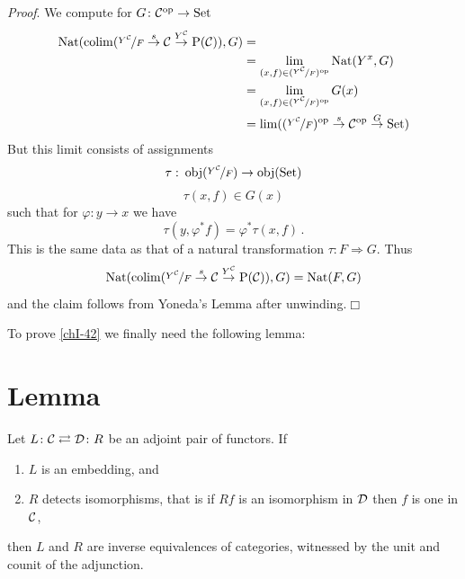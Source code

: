         \emph{Proof}. We compute for $G \colon \mathcal{C}^{\operatorname{op}} \to \operatorname{Set}$
        \begin{align*}
            \operatorname{Nat}(\operatorname*{colim}(\nicefrac{Y^{\mathcal{C}}}{F} \overset{s}{\rightarrow} \mathcal{C} \overset{Y^{\mathcal{C}}}{\rightarrow} \mathrm{P}(\mathcal{C})), G) &= \\
                    &= \lim\limits_{(x,f) \in (\nicefrac{Y^{\mathcal{C}}}{F})^{\operatorname{op}}}\operatorname{Nat}(Y^x, G) \\
                    &= \lim\limits_{(x,f) \in (\nicefrac{Y^{\mathcal{C}}}{F})^{\operatorname{op}}} G(x) \\
                    &= \lim((\nicefrac{Y^{\mathcal{C}}}{F})^{\operatorname{op}} \overset{s}{\rightarrow} \mathcal{C}^{\operatorname{op}} \overset{G}{\rightarrow} \operatorname{Set})
        \end{align*}
        But this limit consists of assignments
        \begin{equation*}
            \tau \,\colon \operatorname{obj}(\nicefrac{Y^{\mathcal{C}}}{F}) \to \operatorname{obj}(\operatorname{Set})
        \end{equation*}
        \begin{equation*}
            \tau(x, f) \in G(x)
        \end{equation*}
        such that for $\varphi \colon y \to x$ we have
        \begin{equation*}
            \tau(y, \varphi^*f) = \varphi^*\tau(x, f) \,.
        \end{equation*}
        This is the same data as that of a natural transformation $\tau \colon F \Rightarrow G$. Thus
        \begin{equation*}
            \operatorname{Nat}(\operatorname*{colim}(\nicefrac{Y^{\mathcal{C}}}{F} \overset{s}{\rightarrow} \mathcal{C} \overset{Y^{\mathcal{C}}}{\rightarrow} \mathrm{P}(\mathcal{C})), G) = \operatorname{Nat}(F, G)
        \end{equation*}
        and the claim follows from Yoneda's Lemma after unwinding.\hfill$\Box$
        \medskip

        To prove \ref{chI-42} we finally need the following lemma:
    \section{Lemma}
        Let $L \colon \mathcal{C} \rightleftarrows \mathcal{D} \colon R$ be an adjoint pair of functors. If
        \begin{enumerate}[label=\roman*)]
            \item 
                $L$ is an embedding, and
            \item 
                $R$ detects isomorphisms, that is if $Rf$ is an isomorphism in $\mathcal{D}$ then $f$ is one in $\mathcal{C}$,
        \end{enumerate}
        then $L$ and $R$ are inverse equivalences of categories, witnessed by the unit and counit of the adjunction.
        \smallskip

